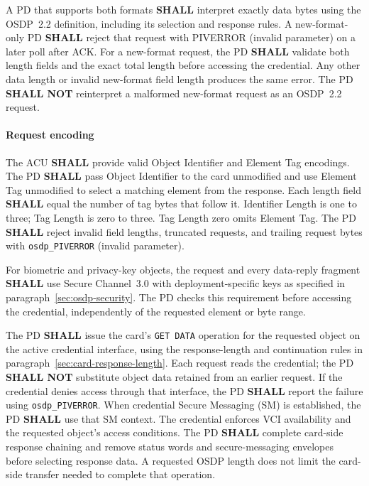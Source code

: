 A PD that supports both formats \textbf{SHALL} interpret exactly
 data bytes using the OSDP~2.2 definition, including its selection
and response rules. A new-format-only PD \textbf{SHALL} reject that request
with PIVERROR  (invalid parameter) on a later poll after ACK.
For a new-format request, the PD \textbf{SHALL} validate both length fields
and the exact total length before accessing the credential. Any other data
length or invalid new-format field length produces the same error.
The PD \textbf{SHALL NOT} reinterpret a malformed new-format request as
an OSDP~2.2 request.



\paragraph{Request encoding}
The ACU \textbf{SHALL} provide valid Object Identifier and Element Tag encodings.
The PD \textbf{SHALL} pass Object Identifier to the card unmodified and use
Element Tag unmodified to select a matching element from the response.
Each length field \textbf{SHALL}
equal the number of tag bytes that follow it. Identifier Length is one to three;
Tag Length is zero to three. Tag Length zero omits Element Tag.
The PD \textbf{SHALL} reject invalid field lengths, truncated requests,
and trailing request bytes with \texttt{osdp\_PIVERROR} 
(invalid parameter).

For biometric and privacy-key objects, the request and every data-reply fragment
\textbf{SHALL} use Secure Channel~3.0 with deployment-specific keys as specified
in paragraph~\ref{sec:osdp-security}. The PD checks this requirement before
accessing the credential, independently of the requested element or byte range.

The PD \textbf{SHALL} issue the card's \texttt{GET DATA} operation for the
requested object on the active credential interface, using the response-length
and continuation rules in paragraph~\ref{sec:card-response-length}. Each request reads the
credential; the PD \textbf{SHALL NOT} substitute object data retained from an
earlier request. If the credential denies access through that interface, the
PD \textbf{SHALL} report the failure using \texttt{osdp\_PIVERROR}.
When credential Secure Messaging (SM) is established, the PD
\textbf{SHALL} use that SM context. The credential enforces VCI availability
and the requested object's access conditions. The PD \textbf{SHALL} complete card-side response
chaining and remove status words and secure-messaging envelopes before
selecting response data. A requested OSDP length does not limit the card-side
transfer needed to complete that operation.

